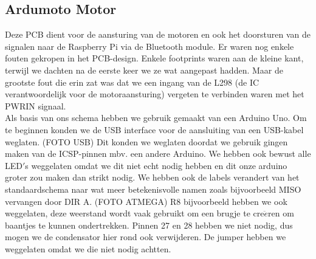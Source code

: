 \subsection{Ardumoto Motor}
Deze PCB dient voor de aansturing van de motoren en ook het doorsturen van de signalen naar de Raspberry Pi via de Bluetooth module. Er waren nog enkele fouten gekropen in het PCB-design. Enkele footprints waren aan de kleine kant, terwijl we dachten na de eerste keer we ze wat aangepast hadden. Maar de grootste fout die erin zat was dat we een ingang van de L298 (de IC verantwoordelijk voor de motoraansturing) vergeten te verbinden waren met het PWRIN signaal. \\
Als basis van ons schema hebben we gebruik gemaakt van een Arduino Uno. Om te beginnen konden we de USB interface voor de aansluiting van een USB-kabel weglaten. (FOTO USB) Dit konden we weglaten doordat we gebruik gingen maken van de ICSP-pinnen mbv. een andere Arduino. We hebben ook bewust alle LED$\prime$s weggelaten omdat we dit niet echt nodig hebben en dit onze arduino groter zou maken dan strikt nodig. We hebben ook de labels verandert van het standaardschema naar wat meer betekenisvolle namen zoals bijvoorbeeld MISO vervangen door DIR A. (FOTO ATMEGA) R8 bijvoorbeeld hebben we ook weggelaten, deze weerstand wordt vaak gebruikt om een brugje te cre$\ddot{e}$ren om baantjes te kunnen ondertrekken. Pinnen 27 en 28 hebben we niet nodig, dus mogen we de condensator hier rond ook verwijderen. De jumper hebben we weggelaten omdat we die niet nodig achtten. 

